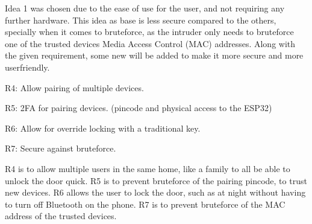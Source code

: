 Idea 1 was chosen due to the ease of use for the user, and not requiring any further hardware.
This idea as base is less secure compared to the others, specially when it comes to bruteforce, as the intruder only needs to bruteforce one of the trusted devices Media Access Control (MAC) addresses.
Along with the given requirement, some new will be added to make it more secure and more userfriendly.
\newline

R4: Allow pairing of multiple devices.

R5: 2FA for pairing devices. (pincode and physical access to the ESP32)

R6: Allow for override locking with a traditional key.

R7: Secure against bruteforce.
\newline

R4 is to allow multiple users in the same home, like a family to all be able to unlock the door quick.
R5 is to prevent bruteforce of the pairing pincode, to trust new devices.
R6 allows the user to lock the door, such as at night without having to turn off Bluetooth on the phone.
R7 is to prevent bruteforce of the MAC address of the trusted devices.